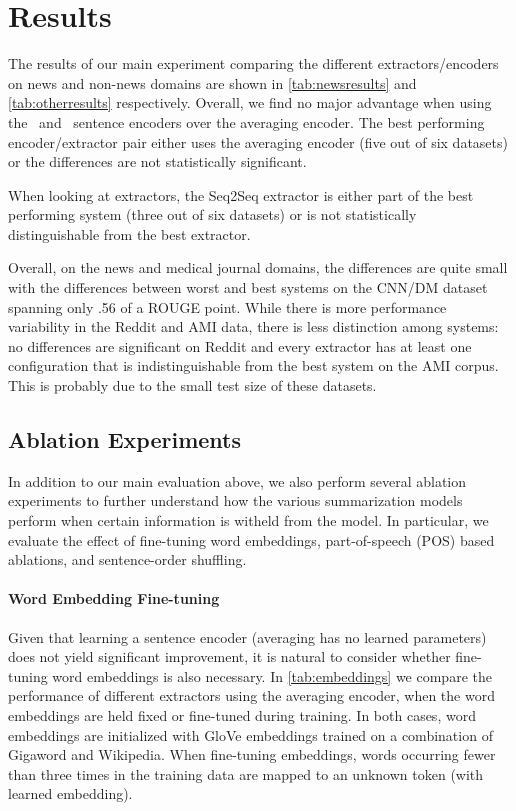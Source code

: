 


\section{Results}

The results of our main experiment comparing the different extractors/encoders
on news and non-news domains are shown in \autoref{tab:newsresults} and
\autoref{tab:otherresults} respectively.  Overall, we find no major advantage
when using the \convolutionalneuralnetwork~and \recurrentneuralnetwork~sentence
encoders over the averaging encoder. The best performing encoder/extractor pair
either uses the averaging encoder (five out of six datasets) or the differences
are not statistically significant. 

When looking at extractors, the Seq2Seq extractor is either part of the best
performing system (three out of six datasets) or is not statistically
distinguishable from the best extractor. 

Overall, on the news and medical journal domains, the differences are quite
small with the differences between worst and best systems on the CNN/DM dataset
spanning only .56 of a ROUGE point. While there is more performance variability
in the Reddit and AMI data, there is less distinction among systems: no
differences are significant on Reddit and every extractor has at least one
configuration that is indistinguishable from the best system on the AMI corpus.
This is probably due to the small test size of these datasets.



\subsection{Ablation Experiments}

In addition to our main evaluation above, we also perform several ablation
experiments to further understand how the various summarization models perform
when certain information is witheld from the model. In particular, we evaluate
the effect of fine-tuning word embeddings, part-of-speech (POS) based
ablations, and sentence-order shuffling.

\paragraph{Word Embedding Fine-tuning} Given that learning a sentence encoder
(averaging has no learned parameters) does not yield significant improvement,
it is natural to consider whether fine-tuning word embeddings is also
necessary.  In \autoref{tab:embeddings} we compare the performance of different
extractors using the averaging encoder, when the word embeddings are held fixed
or fine-tuned during training. In both cases, word embeddings are initialized
with GloVe embeddings trained on a combination of Gigaword and Wikipedia.  When
fine-tuning embeddings, words occurring fewer than three times in the training
data are mapped to an unknown token (with learned embedding).
 
